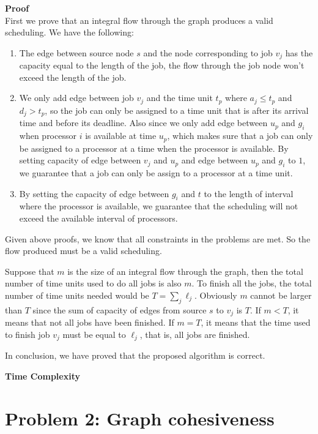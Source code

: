 \documentclass{article}
\newcommand{\Complexity}{\vspace{0.3cm} \noindent\textbf{Time Complexity} \\}
\newcommand{\Proof}{\vspace{0.3cm} \noindent\textbf{Proof} \\}
\begin{document}
\Proof
First we prove that an integral flow through the graph produces a valid scheduling. We have the
following:
\begin{enumerate}
  \item The edge between source node $s$ and the node corresponding to job $v_j$ has the capacity equal
    to the length of the job, the flow through the job node won't exceed the length of the job. 
  \item We only add edge between job $v_j$ and the time unit $t_p$ where $a_j \leq t_p$ and $d_j > t_p$, so the
    job can only be assigned to a time unit that is after its arrival time and before its deadline.
    Also since we only add edge between $u_p$ and $g_i$ when processor $i$ is available at time $u_p$,
    which makes sure that a job can only be assigned to a processor at a time when the processor is
    available. By setting capacity of edge between $v_j$ and $u_p$ and edge between $u_p$ and $g_i$
    to $1$, we guarantee that a job can only be assign to a processor at a time unit. 
  \item By setting the capacity of edge between $g_i$ and $t$ to the length of interval where the
    processor is available, we guarantee that the scheduling will not exceed the available interval
    of processors.
\end{enumerate}
Given above proofs, we know that all constraints in the problems are met. So the flow produced
must be a valid scheduling.  

Suppose that $m$ is the size of an integral flow through the graph, then the total number of time
units used to do all jobs is also $m$. To finish all the jobs, the total number of time units needed
would be $T = \sum_{j}\ell_j$. Obviously $m$ cannot be larger than $T$ since the sum of capacity
of edges from source $s$ to $v_j$ is $T$. If $m < T$, it means that not all jobs have been finished.       
If $m = T$, it means that the time used to finish job $v_j$ must be equal to $\ell_j$, that is, all
jobs are finished.

In conclusion, we have proved that the proposed algorithm is correct.

\Complexity

\section*{Problem 2: Graph cohesiveness}
\end{document}
